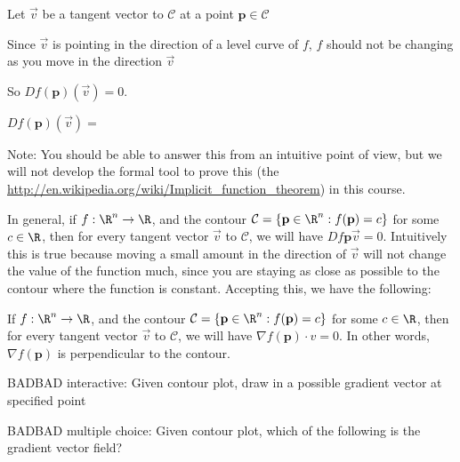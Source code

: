 \documentclass{ximera}
\begin{document}
\begin{question}
	Let $\vec{v}$ be a tangent vector to $\mathcal{C}$ at a point $\mathbf{p} \in \mathcal{C}$ 
	\begin{solution}
		\begin{hint}
			Since $\vec{v}$ is pointing in the direction of a level curve of $f$, $f$ should not be changing as you move in the direction $\vec{v}$
		\end{hint}
		\begin{hint}
			So $Df(\mathbf{p})(\vec{v}) = 0$.
		\end{hint}
		$Df(\mathbf{p})(\vec{v}) = $ 
		
		Note:  You should be able to answer this from an intuitive point of view, but we will not develop the formal tool to prove this 
	(the \href{implicit function theorem}{http://en.wikipedia.org/wiki/Implicit_function_theorem}) in this course.
	\end{solution}
	
	
\end{question}

In general, if $f:\R^n \to \R$, and the contour $\mathcal{C} = \{ \mathbf{p} \in \R^n :  f(\mathbf{p}) = c \}$ for some $c \in \R$, then for every tangent 
vector $\vec{v}$ to $\mathcal{C}$, we will have $Df{\mathbf{p}}{\vec{v}}  =0$.  
Intuitively this is true because moving a small amount in the direction of $\vec{v}$ will not change the value of the function much,
 since you are staying as close as possible to the contour where the function is constant.  Accepting this, we have the following:
 
 \begin{theorem}
  	If $f:\R^n \to \R$, and the contour $\mathcal{C} = \{ \mathbf{p} \in \R^n :  f(\mathbf{p}) = c \}$ for some $c \in \R$, then for every tangent 
vector $\vec{v}$ to $\mathcal{C}$, we will have $\nabla f(\mathbf{p}) \cdot v  =0$.  In other words, $\nabla f(\mathbf{p})$ is perpendicular to the 
contour.
 \end{theorem}
 
 \begin{question}
 BADBAD interactive:
 	Given contour plot, draw in a possible gradient vector at specified point
 \end{question}
 
 \begin{question}
 BADBAD multiple choice:
 	Given contour plot, which of the following is the gradient vector field?
 \end{question}
\end{document}
